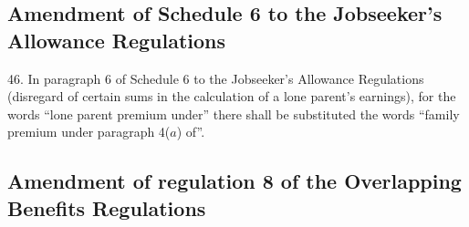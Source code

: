 \documentclass[12pt,a4paper]{article}
\begin{document}
\subsection[46. Amendment of Schedule 6 to the Jobseeker’s Allowance Regulations]{Amendment of Schedule 6 to the Jobseeker’s Allowance Regulations}

46.  In paragraph 6 of Schedule 6 to the Jobseeker’s Allowance Regulations (disregard of certain sums in the calculation of a lone parent’s earnings), for the words “lone parent premium under” there shall be substituted the words “family premium under paragraph 4($a$) of”.

\subsection[47. Amendment of regulation 8 of the Overlapping Benefits Regulations]{Amendment of regulation 8 of the Overlapping Benefits Regulations}
\end{document}
